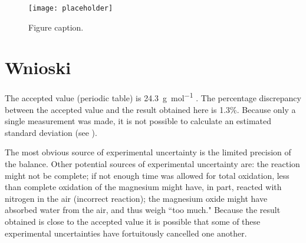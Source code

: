 \documentclass[
	letterpaper, %
	10pt, %
]{CSUniSchoolLabReport}
\begin{document}
\begin{figure}[H] %
	\centering %
	\texttt{[image: placeholder]} %
	\caption{Figure caption.}
\end{figure}


\section{Wnioski}

The accepted value (periodic table) is \SI{24.3}{\gram\per\mole} \autocite{Smith:2022qr}. The percentage discrepancy between the accepted value and the result obtained here is 1.3\%. Because only a single measurement was made, it is not possible to calculate an estimated standard deviation (see \textcite{Smith:2021jd}).

The most obvious source of experimental uncertainty is the limited precision of the balance. Other potential sources of experimental uncertainty are: the reaction might not be complete; if not enough time was allowed for total oxidation, less than complete oxidation of the magnesium might have, in part, reacted with nitrogen in the air (incorrect reaction); the magnesium oxide might have absorbed water from the air, and thus weigh ``too much." Because the result obtained is close to the accepted value it is possible that some of these experimental uncertainties have fortuitously cancelled one another.






\end{document}
